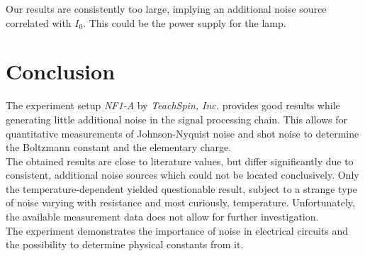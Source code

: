 \documentclass[
    parskip=half, 
    twoside=false,
    twocolumn=true,
    fontsize=11pt,
]{scrarticle}
\begin{document}
Our results are consistently too large, implying an additional noise source correlated with $I_0$. 
This could be the power supply for the lamp.

\section{Conclusion}
The experiment setup \textit{NF1-A} by \textit{TeachSpin, Inc.} provides good results while generating little additional noise in the signal processing chain. This allows for quantitative measurements of Johnson-Nyquist noise and shot noise to determine the Boltzmann constant and the elementary charge.\\
The obtained results are close to literature values, but differ significantly due to consistent, additional noise sources which could not be located conclusively.
Only the temperature-dependent yielded questionable result, subject to a strange type of noise varying with resistance and most curiously, temperature.
Unfortunately, the available measurement data does not allow for further investigation. \\
The experiment demonstrates the importance of noise in electrical circuits and the possibility to determine physical constants from it.

\nocite{*}
\printbibliography
\end{document}
